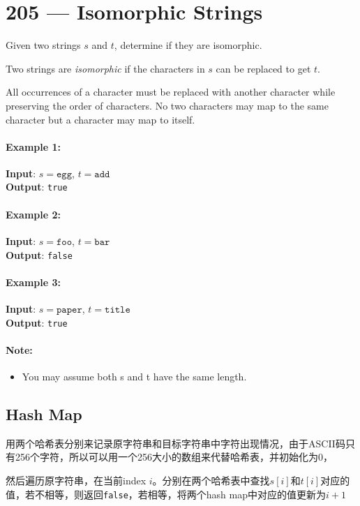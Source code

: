 \section{205 --- Isomorphic Strings}
Given two strings $s$ and $t$, determine if they are isomorphic.
\par
Two strings are \textit{isomorphic} if the characters in $s$ can be replaced to get $t$.
\par
All occurrences of a character must be replaced with another character while preserving the order of characters. No two characters may map to the same character but a character may map to itself.
\paragraph{Example 1:}
\begin{flushleft}
\textbf{Input}: $s = \texttt{egg}$, $t = \texttt{add}$
\\
\textbf{Output}: \texttt{true}
\end{flushleft}

\paragraph{Example 2:}
\begin{flushleft}
\textbf{Input}: $s = \texttt{foo}$, $t = \texttt{bar}$
\\
\textbf{Output}: \texttt{false}
\end{flushleft}

\paragraph{Example 3:}
\begin{flushleft}
\textbf{Input}: $s = \texttt{paper}$, $t = \texttt{title}$
\\
\textbf{Output}: \texttt{true}
\end{flushleft}
\paragraph{Note:}
\begin{itemize}
    \item You may assume both s and t have the same length.
\end{itemize}
\subsection{Hash Map}
用两个哈希表分别来记录原字符串和目标字符串中字符出现情况，由于ASCII码只有256个字符，所以可以用一个256大小的数组来代替哈希表，并初始化为0，
\par
然后遍历原字符串，在当前index $i$。分别在两个哈希表中查找$s[i]$和$t[i]$对应的值，若不相等，则返回\texttt{false}，若相等，将两个hash map中对应的值更新为$i + 1$

